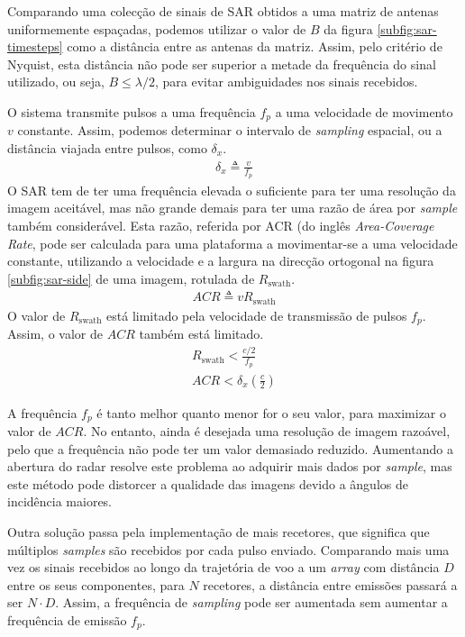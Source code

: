 \documentclass[purist,portuguese]{ist-report}
\begin{document}
Comparando uma colecção de sinais de SAR obtidos a uma matriz de antenas uniformemente espaçadas, podemos utilizar o valor de $B$ da figura \ref{subfig:sar-timesteps} como a distância entre as antenas da matriz. Assim, pelo critério de Nyquist, esta distância não pode ser superior a metade da frequência do sinal utilizado, ou seja, $B \leq \lambda/ 2$, para evitar ambiguidades nos sinais recebidos.

O sistema transmite pulsos a uma frequência $f_p$ a uma velocidade de movimento $v$ constante. Assim, podemos determinar o intervalo de \textit{sampling} espacial, ou a distância viajada entre pulsos, como $\delta_x$.
\begin{gather*}
	\delta_x \triangleq \frac{v}{f_p}
\end{gather*}
O SAR tem de ter uma frequência elevada o suficiente para ter uma resolução da imagem aceitável, mas não grande demais para ter uma razão de área por \textit{sample} também considerável. Esta razão, referida por ACR (do inglês \textit{Area-Coverage Rate}, pode ser calculada para uma plataforma a movimentar-se a uma velocidade constante, utilizando a velocidade e a largura na direcção ortogonal  na figura \ref{subfig:sar-side} de uma imagem, rotulada de $R_{\textrm{swath}}$.
\begin{gather*}
	ACR \triangleq vR_{\textrm{swath}}
\end{gather*}
O valor de $R_{\textrm{swath}}$ está limitado pela velocidade de transmissão de pulsos $f_p$. Assim, o valor de $ACR$ também está limitado.
\begin{gather*}
	R_{\textrm{swath}} < \frac{c/2}{f_p} \\
	ACR < \delta_x\left(\frac{c}{2}\right)
\end{gather*}

A frequência $f_p$ é tanto melhor quanto menor for o seu valor, para maximizar o valor de $ACR$. No entanto, ainda é desejada uma resolução de imagem razoável, pelo que a frequência não pode ter um valor demasiado reduzido. Aumentando a abertura do radar resolve este problema ao adquirir mais dados por \textit{sample}, mas este método pode distorcer a qualidade das imagens devido a ângulos de incidência maiores.

Outra solução passa pela implementação de mais recetores, que significa que múltiplos \textit{samples} são recebidos por cada pulso enviado. Comparando mais uma vez os sinais recebidos ao longo da trajetória de voo a um \textit{array} com distância $D$ entre os seus componentes, para $N$ recetores, a distância entre emissões passará a ser $N \cdot D$. Assim, a frequência de \textit{sampling} pode ser aumentada sem aumentar a frequência de emissão $f_p$.
\end{document}
